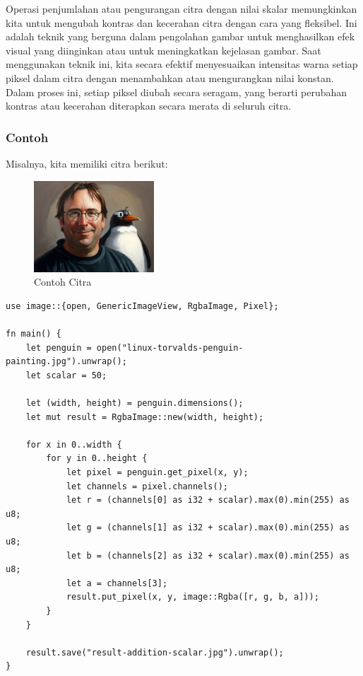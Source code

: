 \documentclass[a4paper,12pt,openany]{book}
\begin{document}
Operasi penjumlahan atau pengurangan citra dengan nilai skalar memungkinkan kita untuk mengubah kontras dan kecerahan citra dengan cara yang fleksibel. Ini adalah teknik yang berguna dalam pengolahan gambar untuk menghasilkan efek visual yang diinginkan atau untuk meningkatkan kejelasan gambar. Saat menggunakan teknik ini, kita secara efektif menyesuaikan intensitas warna setiap piksel dalam citra dengan menambahkan atau mengurangkan nilai konstan. Dalam proses ini, setiap piksel diubah secara seragam, yang berarti perubahan kontras atau kecerahan diterapkan secara merata di seluruh citra.

\subsubsection{Contoh}
Misalnya, kita memiliki citra berikut:
\begin{figure}[H]
    \centering
    \includegraphics[width=0.4\textwidth]{./image/arithmetic/linux-torvalds-penguin-painting.jpg}
    \caption{Contoh Citra}
\end{figure}

\begin{lstlisting}
use image::{open, GenericImageView, RgbaImage, Pixel};

fn main() {
    let penguin = open("linux-torvalds-penguin-painting.jpg").unwrap();
    let scalar = 50;

    let (width, height) = penguin.dimensions();
    let mut result = RgbaImage::new(width, height);

    for x in 0..width {
        for y in 0..height {
            let pixel = penguin.get_pixel(x, y);
            let channels = pixel.channels();
            let r = (channels[0] as i32 + scalar).max(0).min(255) as u8;
            let g = (channels[1] as i32 + scalar).max(0).min(255) as u8;
            let b = (channels[2] as i32 + scalar).max(0).min(255) as u8;
            let a = channels[3];
            result.put_pixel(x, y, image::Rgba([r, g, b, a]));
        }
    }

    result.save("result-addition-scalar.jpg").unwrap();
}
\end{lstlisting}
\end{document}
